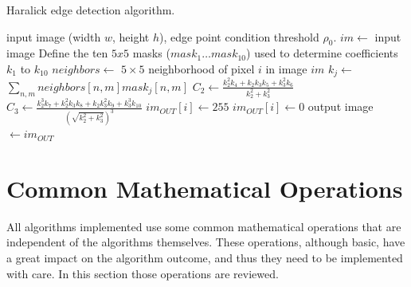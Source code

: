 \documentclass{ipol}
\numberwithin{equation}{section}
\numberwithin{table}{section}
\begin{document}
\begin{algorithm}[t]
\caption{Haralick edge detection algorithm.}
\label{algo:haralick}
\begin{algorithmic}[1]
\REQUIRE input image (width $w$, height $h$), edge point condition threshold $\rho_0$.
\STATE $im \leftarrow$ input image
\STATE Define the ten $5x5$ masks ($mask_1\dots mask_{10}$) used to determine coefficients $k_1$ to $k_{10}$ 
	\STATE $neighbors \leftarrow$ $5\times5$ neighborhood of pixel $i$ in image $im$
		\STATE $k_j \leftarrow$ $\sum_{n,m}neighbors[n,m]mask_j[n,m]$ %
	\ENDFOR
	\STATE $C_2 \leftarrow \frac{k_2^2k_4 + k_2k_3k_5 + k_3^2k_6}{k_2^2 + k_3^2}$
	\STATE $C_3 \leftarrow \frac{k_2^3k_7 + k_2^2k_3k_8 + k_2k_3^2k_9 + k_3^3k_{10}}{(\sqrt{k_2^2 + k_3^2})^3}$
		\STATE $im_{OUT}[i] \leftarrow 255$
	\ELSE
		\STATE $im_{OUT}[i] \leftarrow 0$
	\ENDIF
\ENDFOR
\RETURN output image $\leftarrow im_{OUT}$
\end{algorithmic}
\end{algorithm}


\section{Common Mathematical Operations}
\label{sec:appendix1}

All algorithms implemented use some common mathematical operations that are independent of the algorithms themselves. 
These operations, although basic, have a great impact on the algorithm outcome, and thus they need to be 
implemented with care. In this section those operations are reviewed.



\end{document}
